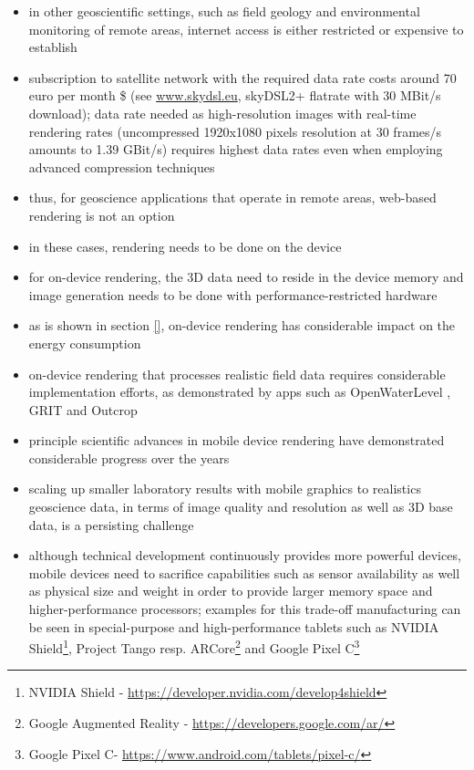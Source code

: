 \documentclass[review]{elsarticle}
\begin{document}
\begin{itemize}
\item in other geoscientific settings, such as field geology \cite{} and environmental monitoring \cite{} of remote areas, internet access is either restricted or expensive to establish
\item subscription to satellite network with the required data rate costs around 70 euro per month \$ (see \url{www.skydsl.eu}, skyDSL2+ flatrate with 30 MBit/s download); data rate needed as high-resolution images with real-time rendering rates (uncompressed 1920x1080 pixels resolution at 30 frames/s amounts to 1.39 GBit/s) requires highest data rates even when employing advanced compression techniques
\item thus, for geoscience applications that operate in remote areas, web-based rendering is not an option
\item in these cases, rendering needs to be done on the device
\item for on-device rendering, the 3D data need to reside in the device memory and image generation needs to be done with performance-restricted hardware
\item as is shown in section \ref{}, on-device rendering has considerable impact on the energy consumption
\item on-device rendering that processes realistic field data requires considerable implementation efforts, as demonstrated by apps such as OpenWaterLevel \cite{}, GRIT \cite{Kehl2016_VGCabstract} and Outcrop \cite{Viseur2014_VGCabstract}
\item principle scientific advances in mobile device rendering have demonstrated considerable progress over the years \cite{Garcia2015,Kehl2015c,Agus2017}
\item scaling up smaller laboratory results with mobile graphics to realistics geoscience data, in terms of image quality and resolution as well as 3D base data, is a persisting challenge
\item although technical development continuously provides more powerful devices, mobile devices need to sacrifice capabilities such as sensor availability as well as physical size and weight in order to provide larger memory space and higher-performance processors; examples for this trade-off manufacturing can be seen in special-purpose and high-performance tablets such as NVIDIA Shield\footnote{NVIDIA Shield - \url{https://developer.nvidia.com/develop4shield}}, Project Tango resp. ARCore\footnote{Google Augmented Reality - \url{https://developers.google.com/ar/}} and Google Pixel C\footnote{Google Pixel C- \url{https://www.android.com/tablets/pixel-c/}}

\end{itemize}
\end{document}
